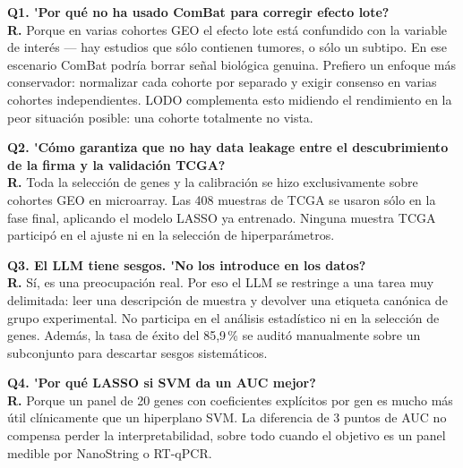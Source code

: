 \documentclass[11pt, a4paper]{article}
\begin{document}
\medskip

\begin{prcaja}
\textbf{Q1. \'{}Por qu\'e no ha usado ComBat para corregir efecto lote?}\\[4pt]
\textbf{R.} Porque en varias cohortes GEO el efecto lote est\'a confundido con la variable de inter\'es --- hay estudios que s\'olo contienen tumores, o s\'olo un subtipo. En ese escenario ComBat podr\'ia borrar se\~nal biol\'ogica genuina. Prefiero un enfoque m\'as conservador: normalizar cada cohorte por separado y exigir consenso en varias cohortes independientes. LODO complementa esto midiendo el rendimiento en la peor situaci\'on posible: una cohorte totalmente no vista.
\end{prcaja}

\begin{prcaja}
\textbf{Q2. \'{}C\'omo garantiza que no hay data leakage entre el descubrimiento de la firma y la validaci\'on TCGA?}\\[4pt]
\textbf{R.} Toda la selecci\'on de genes y la calibraci\'on se hizo exclusivamente sobre cohortes GEO en microarray. Las 408 muestras de TCGA se usaron s\'olo en la fase final, aplicando el modelo LASSO ya entrenado. Ninguna muestra TCGA particip\'o en el ajuste ni en la selecci\'on de hiperpar\'ametros.
\end{prcaja}

\begin{prcaja}
\textbf{Q3. El LLM tiene sesgos. \'{}No los introduce en los datos?}\\[4pt]
\textbf{R.} S\'i, es una preocupaci\'on real. Por eso el LLM se restringe a una tarea muy delimitada: leer una descripci\'on de muestra y devolver una etiqueta can\'onica de grupo experimental. No participa en el an\'alisis estad\'istico ni en la selecci\'on de genes. Adem\'as, la tasa de \'exito del 85,9\,\% se audit\'o manualmente sobre un subconjunto para descartar sesgos sistem\'aticos.
\end{prcaja}

\begin{prcaja}
\textbf{Q4. \'{}Por qu\'e LASSO si SVM da un AUC mejor?}\\[4pt]
\textbf{R.} Porque un panel de 20 genes con coeficientes expl\'icitos por gen es mucho m\'as \'util cl\'inicamente que un hiperplano SVM. La diferencia de 3 puntos de AUC no compensa perder la interpretabilidad, sobre todo cuando el objetivo es un panel medible por NanoString o RT-qPCR.
\end{prcaja}
\end{document}
